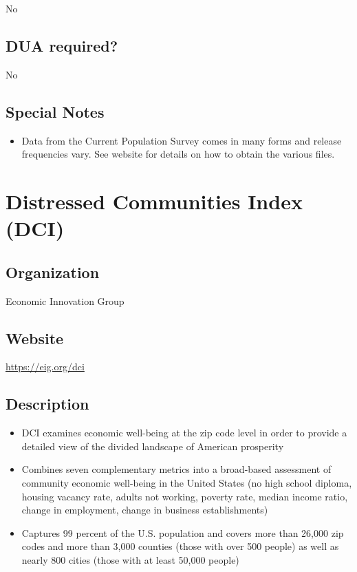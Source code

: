 \documentclass[
]{book}
\providecommand{\tightlist}{%
  \setlength{\itemsep}{0pt}\setlength{\parskip}{0pt}}
\begin{document}
No

\hypertarget{dua-required-22}{%
\section{DUA required?}\label{dua-required-22}}

No

\hypertarget{special-notes-22}{%
\section{Special Notes}\label{special-notes-22}}

\begin{itemize}
\tightlist
\item
  Data from the Current Population Survey comes in many forms and release frequencies vary. See website for details on how to obtain the various files.
\end{itemize}

\mainmatter

\hypertarget{distressed-communities-index-dci}{%
\chapter{Distressed Communities Index (DCI)}\label{distressed-communities-index-dci}}

\hypertarget{organization-23}{%
\section{Organization}\label{organization-23}}

Economic Innovation Group

\hypertarget{website-23}{%
\section{Website}\label{website-23}}

\url{https://eig.org/dci}

\hypertarget{description-23}{%
\section{Description}\label{description-23}}

\begin{itemize}
\tightlist
\item
  DCI examines economic well-being at the zip code level in order to provide a detailed view of the divided landscape of American prosperity
\item
  Combines seven complementary metrics into a broad-based assessment of community economic well-being in the United States (no high school diploma, housing vacancy rate, adults not working, poverty rate, median income ratio, change in employment, change in business establishments)
\item
  Captures 99 percent of the U.S. population and covers more than 26,000 zip codes and more than 3,000 counties (those with over 500 people) as well as nearly 800 cities (those with at least 50,000 people)
\end{itemize}
\end{document}
